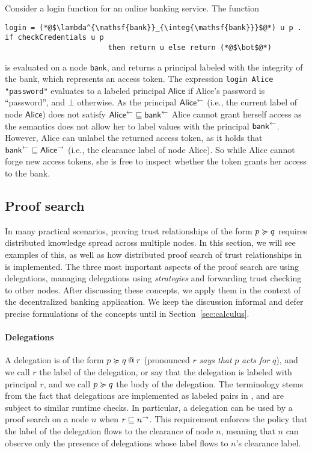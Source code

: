 Consider a login function for an online banking service. The function
\begin{lstlisting}
login = (*@$\lambda^{\mathsf{bank}}_{\integ{\mathsf{bank}}}$@*) u p . if checkCredentials u p
                        then return u else return (*@$\bot$@*)
\end{lstlisting}
is evaluated on a node $\mathsf{bank}$, and returns a principal labeled with the integrity of the bank, which represents an access token. The expression \lstinline[mathescape]!login Alice "password"! evaluates to a labeled principal $\mathsf{Alice}$ if Alice's password is ``password'', and $\bot$ otherwise. As the principal $\integ{\mathsf{Alice}}$ (i.e., the current label of node $\mathsf{Alice}$) does not satisfy $\integ{\mathsf{Alice}} \flowsto \integ{\mathsf{bank}}$ Alice cannot grant herself access as the semantics does not allow her to label values with the principal $\integ{\mathsf{bank}}$.
However, Alice can unlabel the returned access token, as it holds that $\integ{\mathsf{bank}} \flowsto \conf{\mathsf{Alice}}$ (i.e., the clearance label of node Alice). So while Alice cannot forge new access tokens, she is free to inspect whether the token grants her access to the bank.

\subsection{Proof search}
In many practical scenarios, proving trust relationships of the form $p \actsfor q$ requires distributed knowledge spread across multiple nodes. In this section, we will see examples of this, as well as how distributed proof search of trust relationships in \lang{} is implemented. The three most important aspects of the proof search are using delegations, managing delegations using \emph{strategies} and forwarding trust checking to other nodes. After discussing these concepts, we apply them in the context of the decentralized banking application. We keep the discussion informal and defer precise formulations of the concepts until in Section~\ref{sec:calculus}.

\paragraph{Delegations}
A delegation is of the form $\lb{r}{p \actsfor q}$ (pronounced $r$ \emph{says that} $p$ \emph{acts for} $q$), and we call $r$ the label of the delegation, or say that the delegation is labeled with principal $r$, and we call $p \actsfor q$ the body of the delegation. The terminology stems from the fact that delegations are implemented as labeled pairs in \lang, and are subject to similar runtime checks. In particular, a delegation can be used by a proof search on a node $n$ when $r \flowsto \conf{n}$. This requirement enforces the policy that the label of the delegation flows to the clearance of node $n$, meaning that $n$ can observe only the presence of delegations whose label flows to $n$'s clearance label.

